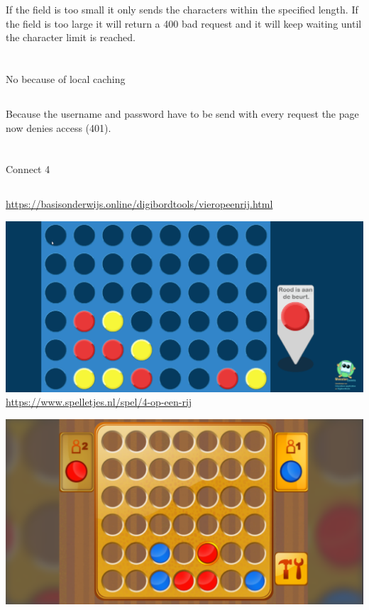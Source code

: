 \documentclass{article}
\begin{document}
     If the field is too small it only sends the characters within the specified length.
     If the field is too large it will return a 400 bad request and it will keep waiting until the character limit is reached.

     \section{}
     \subsection{}

     No because of local caching

     \subsection{}

     Because the username and password have to be send with every request the page now denies access (401).

     \section{}
     \subsection{}
     Connect 4

     \subsection{}
     \url{https://basisonderwijs.online/digibordtools/vieropeenrij.html}

     \includegraphics[width=\linewidth]{3}
     \url{https://www.spelletjes.nl/spel/4-op-een-rij}
     
     \includegraphics[width=\linewidth]{1}
\end{document}
